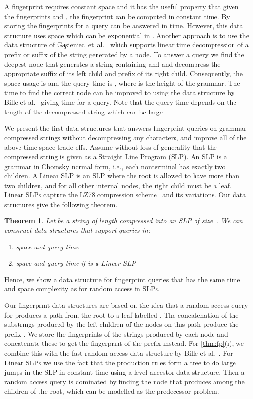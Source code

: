 \documentclass[11pt]{article}
\newtheorem{theorem}{Theorem}
\begin{document}
A fingerprint requires constant space and it has the useful property that given the fingerprints  and , the fingerprint  can be computed in constant time. By storing the fingerprints  for  a query can be answered in  time. However, this data structure uses  space which can be exponential in . Another approach is to use the data structure of G\c{a}sieniec~et~al.~\cite{gasieniec2005real} which supports linear time decompression of a prefix or suffix of the string generated by a node. To answer a query we find the deepest node that generates a string containing  and  and decompress the appropriate suffix of its left child and prefix of its right child. Consequently, the space usage is  and the query time is , where  is the height of the grammar. The  time to find the correct node can be improved to  using the data structure by Bille et al.~\cite{bille2011random} giving  time for a  query. Note that the query time depends on the length of the decompressed string which can be large.

We present the first data structures that answers fingerprint queries on grammar compressed strings without decompressing any characters, and improve all of the above time-space trade-offs. Assume without loss of generality that the compressed string is given as a Straight Line Program (SLP). An SLP is a grammar in Chomsky normal form, i.e., each nonterminal has exactly two children. A Linear SLP is an SLP where the root is allowed to have more than two children, and for all other internal nodes, the right child must be a leaf. Linear SLPs capture the LZ78 compression scheme~\cite{lz78} and its variations. Our data structures give the following theorem.

\begin{theorem}\label{thm:fp}
	Let  be a string of length  compressed into an SLP  of size~. We can construct data structures that support  queries in:
	\begin{enumerate}
		\item[(i)]  space and query time 
		\item[(ii)]  space and query time  if  is a Linear SLP
	\end{enumerate}
\end{theorem}

\noindent Hence, we show a data structure for fingerprint queries that has the same time and space complexity as for random access in SLPs. 

Our fingerprint data structures are based on the idea that a random access query for  produces a path from the root to a leaf labelled . The concatenation of the substrings produced by the left children of the nodes on this path produce the prefix . We store the fingerprints of the strings produced by each node and concatenate these to get the fingerprint of the prefix instead. For \autoref{thm:fp}(i), we combine this with the fast random access data structure by Bille et al.~\cite{bille2011random}. For Linear SLPs we use the fact that the production rules form a tree to do large jumps in the SLP in constant time using a level ancestor data structure. Then a random access query is dominated by finding the node that produces  among the children of the root, which can be modelled as the predecessor problem.
\end{document}
